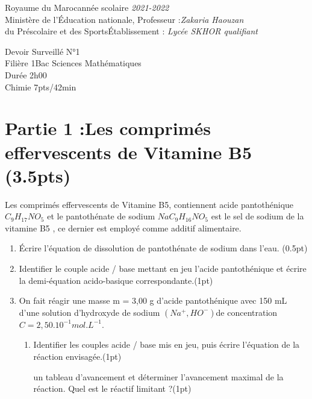 \documentclass[12pt]{article}
\newcommand\headerMe[2]{\noindent{}#1\hfill#2}
\begin{document}
\headerMe{Royaume du Maroc}{année scolaire \emph{2021-2022}}\\
\headerMe{Ministère de l'Éducation nationale, }{  Professeur :\emph{Zakaria Haouzan}}\\
\headerMe{du Préscolaire et des Sports}{Établissement : \emph{Lycée SKHOR qualifiant}}\\

\begin{center}
Devoir Surveillé  N°1 \\
    Filière 1Bac Sciences Mathématiques\\
Durée 2h00
\\
    \vspace{.2cm}
\hrulefill
\Large{Chimie 7pts/42min}
\hrulefill\\

\end{center}

 \section*{Partie 1 :Les comprimés effervescents de Vitamine B5 \dotfill(3.5pts) }
 
 Les comprimés effervescents de Vitamine B5, contiennent acide pantothénique $C_9H_{17}NO_5$ et le
   pantothénate de sodium $NaC_9H_{16}NO_5$ est le sel de sodium de la vitamine B5 , ce dernier est
employé comme additif alimentaire.

\begin{enumerate}

  \item Écrire l’équation de dissolution de pantothénate de sodium dans l’eau. \dotfill(0.5pt)

  \item Identifier le couple acide / base mettant en jeu l’acide pantothénique et écrire la demi-équation acido-basique correspondante.\dotfill(1pt)

\item  On fait réagir une masse m = 3,00 g d’acide pantothénique avec 150 mL d’une solution
d’hydroxyde de sodium $(Na^+, HO^-)$de concentration $C=2,50.10^{-1} mol.L^{-1}$.
    \begin{enumerate}
      \item Identifier les couples acide / base mis en jeu, puis écrire l’équation de la réaction envisagée.\dotfill(1pt)

       un tableau d’avancement et déterminer l’avancement maximal de la réaction. Quel est
        le réactif limitant ?\dotfill(1pt)
    \end{enumerate}
\end{enumerate}
\end{document}
